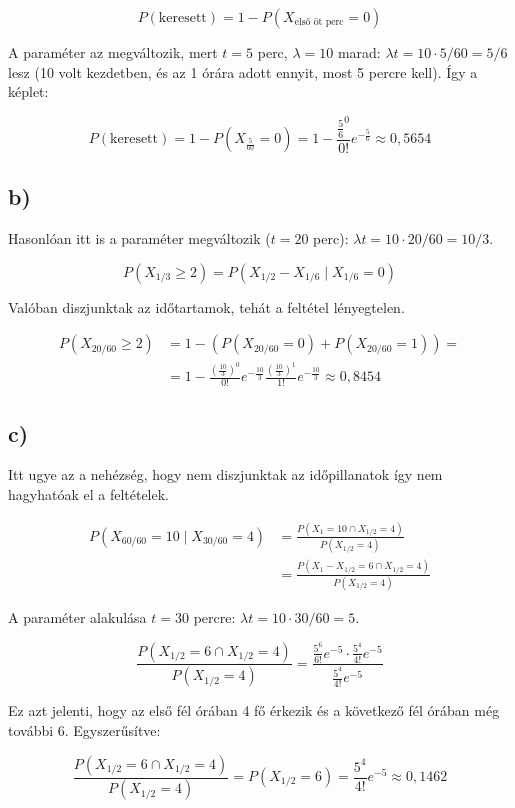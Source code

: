 \documentclass[a4paper,12pt]{article}   		%
\begin{document}
\[P(\text{keresett}) = 1 - P(X_{\text{első öt perc}} = 0)\]

A paraméter az megváltozik, mert $t = 5$ perc, $\lambda = 10$ marad: 
$\lambda t = 10 \cdot 5/60 = 5/6$ lesz (10 volt kezdetben, 
és az 1 órára adott ennyit, most 5 percre kell). Így a képlet:

\[P(\text{keresett}) = 1 - P(X_\frac{5}{60} = 0) = 1 - \frac{\frac{5}{6}^0}{0!}
e^{-\frac{5}{6}} \approx 0,5654\]

\subsection*{b)}
Hasonlóan itt is a paraméter megváltozik ($t=20$ perc): 
$\lambda t = 10 \cdot 20/60 = 10/3$.

\[P(X_{1/3} \geq 2) = P(X_{1/2}-X_{1/6} \mid X_{1/6}=0)\]

Valóban diszjunktak az időtartamok, tehát a feltétel lényegtelen.

\[
\begin{split}
P(X_{20/60} \geq 2) &= 
1 - \left( P(X_{20/60} = 0) + P(X_{20/60} = 1)\right) = \\
&= 1 - \frac{\left(\frac{10}{3}\right)^0}{0!}e^{-\frac{10}{3}}
\frac{\left(\frac{10}{3}\right)^1}{1!}e^{-\frac{10}{3}}
\approx 0,8454
\end{split}
\]

\subsection*{c)}
Itt ugye az a nehézség, hogy nem diszjunktak az időpillanatok így nem
hagyhatóak el a feltételek.

\[
\begin{split}
P(X_{60/60} = 10 \mid X_{30/60} = 4) &= \frac{P(X_1 = 10 \cap X_{1/2} = 4)}
{P(X_{1/2} = 4)} \\
&= \frac{P(X_1-X_{1/2} = 6 \cap X_{1/2} = 4)}{P(X_{1/2} = 4)}
\end{split}
\]

A paraméter alakulása $t = 30$ percre: 
$\lambda t = 10 \cdot 30/60 = 5$.

\[
\frac{P(X_{1/2} = 6 \cap X_{1/2} = 4)}{P(X_{1/2} = 4)} = \frac{\frac{5^6}{6!}
e^{-5} \cdot \frac{5^4}{4!} e^{-5}}{\frac{5^4}{4!} e^{-5}}
\]

Ez azt jelenti, hogy az első fél órában 4 fő érkezik és a következő fél
órában még további 6. Egyszerűsítve:

\[
\frac{P(X_{1/2} = 6 \cap X_{1/2} = 4)}{P(X_{1/2} = 4)} = 
P(X_{1/2} = 6) =
\frac{5^4}{4!} e^{-5} \approx 0,1462
\]
\end{document}

